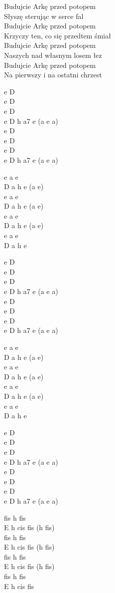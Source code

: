 \begin{textn}
    Budujcie Arkę przed potopem\\
    Słyszę sterując w serce fal\\
    Budujcie Arkę przed potopem\\
    Krzyczy ten, co się przedtem śmiał\\
    Budujcie Arkę przed potopem\\
    Naszych nad własnym losem łez\\
    Budujcie Arkę przed potopem\\
    Na pierwszy i na ostatni chrzest
\end{textn}
\begin{chordw}
    e D\\
    e D\\
    e D\\
    e D h a7 e (a e a)\\
    e D\\
    e D\\
    e D\\
    e D h a7 e (a e a)

    e a e\\
    D a h e (a e)\\
    e a e\\
    D a h e (a e)\\
    e a e\\
    D a h e (a e)\\
    e a e\\
    D a h e

    e D\\
    e D\\
    e D\\
    e D h a7 e (a e a)\\
    e D\\
    e D\\
    e D\\
    e D h a7 e (a e a)

    e a e\\
    D a h e (a e)\\
    e a e\\
    D a h e (a e)\\
    e a e\\
    D a h e (a e)\\
    e a e\\
    D a h e

    e D\\
    e D\\
    e D\\
    e D h a7 e (a e a)\\
    e D\\
    e D\\
    e D\\
    e D h a7 e (a e a)

    fis h fis\\
    E h cis fis (h fis)\\
    fis h fis\\
    E h cis fis (h fis)\\
    fis h fis\\
    E h cis fis (h fis)\\
    fis h fis\\
    E h cis fis
\end{chordw}